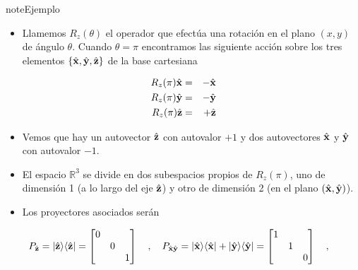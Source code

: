 \documentclass[letterpaper,10pt,english]{jupyterBook}
\newcommand{\bra}[1]{\langle #1|}
\newcommand{\ket}[1]{|#1\rangle}
\begin{document}
\begin{sphinxadmonition}{note}{Ejemplo}
\begin{itemize}
\item {} 
\sphinxAtStartPar
Llamemos \(R_z(\theta)\) el operador que efectúa una rotación  en el plano  \((x,y)\) de ángulo \(\theta\). Cuando \(\theta = \pi\) encontramos las siguiente acción sobre los tres elementos \(\{\hat{\bf x},\hat{\bf y},\hat{\bf z}\}\)
de la base cartesiana

\end{itemize}
\label{equation:docs/Part_01_Formalismo/Chapter_01_02_Formalismo_matemático/01_03_Operadores_myst:a245dbed-7d7c-4b5e-a6eb-cf0d448c9234}\begin{eqnarray}
R_z(\pi)\hat{\bf x} &=&-\hat{\bf x}  \\ \rule{0mm}{6mm}
R_z(\pi)\hat{\bf y} &=& -\hat{\bf y}  \\ \rule{0mm}{6mm}
R_z(\pi)\hat{\bf z} &=& + \hat{\bf z}  
\end{eqnarray}\begin{itemize}
\item {} 
\sphinxAtStartPar
Vemos que hay un autovector \(\hat{\bf z}\) con autovalor \(+1\) y dos autovectores \(\hat{\bf x} \) y \(\hat{\bf y} \)
con autovalor \(-1\).

\item {} 
\sphinxAtStartPar
El espacio \({\mathbb R}^3\) se divide en dos subespacios propios de \(R_z(\pi)\), uno de dimensión 1 (a lo largo del eje \(\hat{\bf z}\)) y otro de dimensión 2 (en el plano \((\hat{\bf x},\hat{\bf y})\)).

\item {} 
\sphinxAtStartPar
Los proyectores asociados serán

\end{itemize}
\begin{equation*}
\begin{split}
P_{\hat{\bf z}}= \ket{\hat{\bf z}}\bra{\hat{\bf z}}=\begin{bmatrix} 0 & & \\ & 0 & \\ & & 1 \end{bmatrix}~~~,~~~
P_{\hat{\bf x}\hat{\bf y}}= \ket{\hat{\bf x}}\bra{\hat{\bf x}}+\ket{\hat{\bf y}}\bra{\hat{\bf y}}=\begin{bmatrix} 1 & & \\ & 1 & \\ & & 0 \end{bmatrix}~~~,~~~
\end{split}
\end{equation*}\end{sphinxadmonition}
\end{document}
